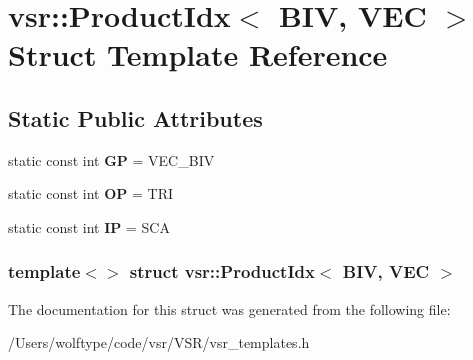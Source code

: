 \hypertarget{structvsr_1_1_product_idx_3_01_b_i_v_00_01_v_e_c_01_4}{\section{vsr\-:\-:Product\-Idx$<$ B\-I\-V, V\-E\-C $>$ Struct Template Reference}
\label{structvsr_1_1_product_idx_3_01_b_i_v_00_01_v_e_c_01_4}
}
\subsection*{Static Public Attributes}
\begin{DoxyCompactItemize}
\item 
\hypertarget{structvsr_1_1_product_idx_3_01_b_i_v_00_01_v_e_c_01_4_adeacf42d930d3b3dd344b6f6780e77b2}{static const int {\bfseries G\-P} = V\-E\-C\-\_\-\-B\-I\-V}\label{structvsr_1_1_product_idx_3_01_b_i_v_00_01_v_e_c_01_4_adeacf42d930d3b3dd344b6f6780e77b2}

\item 
\hypertarget{structvsr_1_1_product_idx_3_01_b_i_v_00_01_v_e_c_01_4_afddfab9f696e3d81bed844793b6505c9}{static const int {\bfseries O\-P} = T\-R\-I}\label{structvsr_1_1_product_idx_3_01_b_i_v_00_01_v_e_c_01_4_afddfab9f696e3d81bed844793b6505c9}

\item 
\hypertarget{structvsr_1_1_product_idx_3_01_b_i_v_00_01_v_e_c_01_4_a757ae51d9cec0cc9bf7ab2453a97b69f}{static const int {\bfseries I\-P} = S\-C\-A}\label{structvsr_1_1_product_idx_3_01_b_i_v_00_01_v_e_c_01_4_a757ae51d9cec0cc9bf7ab2453a97b69f}

\end{DoxyCompactItemize}
\subsubsection*{template$<$$>$ struct vsr\-::\-Product\-Idx$<$ B\-I\-V, V\-E\-C $>$}



The documentation for this struct was generated from the following file\-:\begin{DoxyCompactItemize}
\item 
/\-Users/wolftype/code/vsr/\-V\-S\-R/vsr\-\_\-templates.\-h\end{DoxyCompactItemize}
